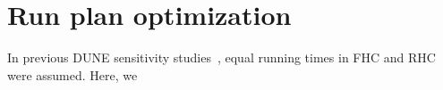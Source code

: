 \section{Run plan optimization}
\label{sec:run_plan_opt}

In previous DUNE sensitivity studies~\cite{Abi:2020qib}, equal running times in FHC and RHC were assumed. Here, we 
